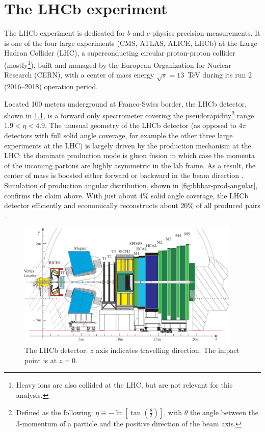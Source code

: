 \chapter{The LHCb experiment}
\label{ref:detector}

The LHCb experiment is dedicated for $b$ and $c$-physics precision measurements.
It is one of the four large experiments
(CMS, ATLAS, ALICE, LHCb) at the Large Hadron Collider (LHC),
a superconducting circular proton-proton collider (mostly\footnote{
    Heavy ions are also collided at the LHC,
    but are not relevant for this analysis.
}), built and managed by
the European Organization for Nuclear Research (CERN),
with a center of mass energy
$\sqrt{s} = 13$~TeV during its run 2 (2016--2018) operation period.

Located 100 meters underground at Franco-Swiss border,
the LHCb detector,
shown in \cref{fig:lhcb-detector},
is a forward only spectrometer covering the pseudorapidity\footnote{
    Defined as the following:
    $\eta \equiv -\ln\left[\tan\left(\frac{\theta}{2}\right)\right]$,
    with $\theta$ the angle between the 3-momentum of a particle
    and the positive direction of the beam axis.
}
range $1.9 < \eta < 4.9$.
The unusual geometry of the LHCb detector
(as opposed to $4\pi$ detectors with full solid angle coverage,
for example the other three large experiments at the LHC)
is largely driven by the \bbbar production mechanism at the LHC:
the dominate production mode is gluon fusion in which case the momenta of the
incoming partons are highly asymmetric in the lab frame.
As a result, the \bbbar center of mass is boosted either forward or backward
in the beam direction \cite{Altarelli_2008}.
Simulation of \bbbar production angular distribution,
shown in \cref{fig:bbbar-prod-angular},
confirms the claim above.
With just about 4\% solid angle coverage,
the LHCb detector efficiently and economically reconstructs about 20\%
of all produced \bbbar pairs \cite{Belyaev_2021}.

\begin{figure}[!htb]
    \centering
    \includegraphics[width=0.95\textwidth]{./figs-detector/lhcb_detector_view.pdf}
    \caption{
        The LHCb detector.
        $z$ axis indicates \bbbar travelling direction.
        The impact point is at $z = 0$.
    }
    \label{fig:lhcb-detector}
\end{figure}

